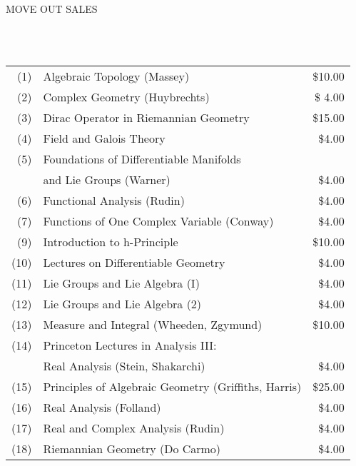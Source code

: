 \documentclass{article}[12pt]
\begin{document}
\newcommand{\spa}{\mbox{ }}
\colorbox{blue!10}{\begin{minipage}{297.5pt}
\begin{center} {\color{orange} \large MOVE OUT SALES} \end{center}
\end{minipage} } \\
\spa\\[-5pt]
\colorbox{lime!10}{\begin{minipage}{297.5pt} \color{blue}
\begin{tabular}{rlr}
(1) & Algebraic Topology (Massey)& \$10.00	\\[0.05in]
(2) & Complex Geometry (Huybrechts)& \$ 4.00 \\[0.05in]
(3) & Dirac Operator in Riemannian Geometry & \$15.00 \\[0.05in]
(4) & Field and Galois Theory & \$4.00 \\[0.05in]
(5) & Foundations of Differentiable Manifolds & \\
& and Lie Groups (Warner) & \$4.00 \\[0.05in]
(6) & Functional Analysis (Rudin)& \$4.00 \\[0.05in]
(7) & Functions of One Complex Variable (Conway)& \$4.00 \\[0.05in]
(9) & Introduction to h-Principle & \$10.00 \\[0.05in]
(10) & Lectures on Differentiable Geometry & \$4.00 \\[0.05in]
(11) & Lie Groups and Lie Algebra (I) & \$4.00 \\[0.05in]
(12) & Lie Groups and Lie Algebra (2) & \$4.00 \\[0.05in]
(13) & Measure and Integral (Wheeden, Zgymund) & \$10.00 \\[0.05in]
(14) & Princeton Lectures in Analysis III:&\\
& Real Analysis (Stein, Shakarchi)& \$4.00 \\[0.05in]
(15) & Principles of Algebraic Geometry (Griffiths, Harris)& \$25.00 \\[0.05in] 
(16) & Real Analysis (Folland) & \$4.00 \\[0.05in]
(17) & Real and Complex Analysis (Rudin) & \$4.00 \\[0.05in]
(18) & Riemannian Geometry (Do Carmo) & \$4.00
\end{tabular} \end{minipage} }\\
\end{document}
